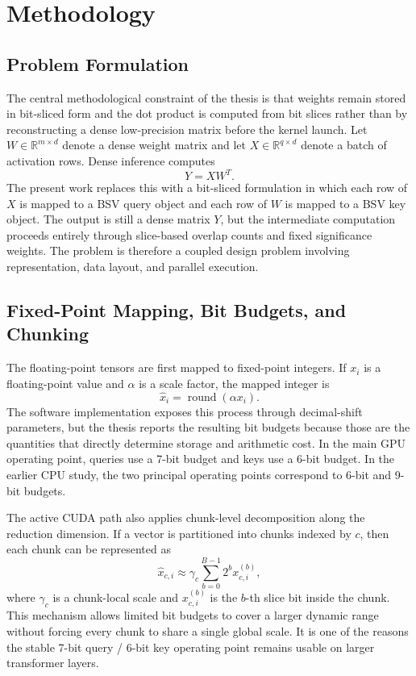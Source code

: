 \section{Methodology}\label{sec:methodology}
\subsection{Problem Formulation}
The central methodological constraint of the thesis is that weights remain stored in bit-sliced form and the dot product is computed from bit slices rather than by reconstructing a dense low-precision matrix before the kernel launch. Let $W \in \mathbb{R}^{m \times d}$ denote a dense weight matrix and let $X \in \mathbb{R}^{q \times d}$ denote a batch of activation rows. Dense inference computes
\begin{equation}
Y = XW^T.
\end{equation}
The present work replaces this with a bit-sliced formulation in which each row of $X$ is mapped to a BSV query object and each row of $W$ is mapped to a BSV key object. The output is still a dense matrix $Y$, but the intermediate computation proceeds entirely through slice-based overlap counts and fixed significance weights. The problem is therefore a coupled design problem involving representation, data layout, and parallel execution.

\subsection{Fixed-Point Mapping, Bit Budgets, and Chunking}
The floating-point tensors are first mapped to fixed-point integers. If $x_i$ is a floating-point value and $\alpha$ is a scale factor, the mapped integer is
\begin{equation}
    \hat{x}_i = \operatorname{round}(\alpha x_i).
\end{equation}
The software implementation exposes this process through decimal-shift parameters, but the thesis reports the resulting bit budgets because those are the quantities that directly determine storage and arithmetic cost. In the main GPU operating point, queries use a 7-bit budget and keys use a 6-bit budget. In the earlier CPU study, the two principal operating points correspond to 6-bit and 9-bit budgets.

The active CUDA path also applies chunk-level decomposition along the reduction dimension. If a vector is partitioned into chunks indexed by $c$, then each chunk can be represented as
\begin{equation}
    \hat{x}_{c,i} \approx \gamma_c \sum_{b=0}^{B-1} 2^b x_{c,i}^{(b)},
\end{equation}
where $\gamma_c$ is a chunk-local scale and $x_{c,i}^{(b)}$ is the $b$-th slice bit inside the chunk. This mechanism allows limited bit budgets to cover a larger dynamic range without forcing every chunk to share a single global scale. It is one of the reasons the stable 7-bit query / 6-bit key operating point remains usable on larger transformer layers.

